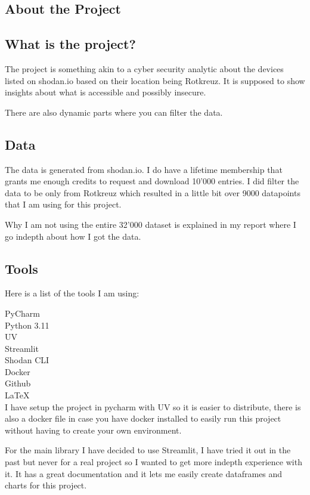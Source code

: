 \documentclass[11pt,a4paper]{article}
\begin{document}
\begin{about}
\section{About the Project}
\subsection{What is the project?}
The project is something akin to a cyber security analytic about the devices listed on shodan.io based on their location
being Rotkreuz. It is supposed to show insights about what is accessible and possibly insecure.

There are also dynamic parts where you can filter the data.
\subsection{Data}
The data is generated from shodan.io. I do have a lifetime membership that grants me enough credits to request and
download 10'000 entries. I did filter the data to be only from Rotkreuz which resulted in a little bit over 9000
datapoints that I am using for this project.

Why I am not using the entire 32'000 dataset is explained in my report where I go indepth about how I got the data.

\subsection{Tools}
Here is a list of the tools I am using:

PyCharm \\
Python 3.11 \\
UV \\
Streamlit \\
Shodan CLI \\
Docker \\
Github \\
LaTeX \\

I have setup the project in pycharm with UV so it is easier to distribute, there is also a docker file in case you have
docker installed to easily run this project without having to create your own environment.

For the main library I have decided to use Streamlit, I have tried it out in the past but never for a real project so I
wanted to get more indepth experience with it. It has a great documentation and it lets me easily create dataframes and
charts for this project.


\end{about}
\end{document}
